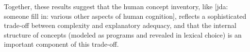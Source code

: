 \documentclass[10pt,letterpaper]{article}
\newcommand{\jda}[1]{{\color{blue}[jda: #1]}}
\begin{document}

Together, these results suggest that the human concept inventory, like \jda{someone fill in: various other aspects of human cognition}, reflects a sophisticated trade-off between complexity and explanatory adequacy, and that the internal structure of concepts (modeled as programs and revealed in lexical choice) is an important component of this trade-off.

\end{document}
